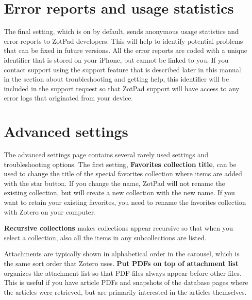 \documentclass[oneside, openany, 12pt]{tufte-book}
\newcommand{\iphone}[1]{#1}
\newcommand{\ipad}[1]{}
\newcommand{\ipadfootnote}[1]{}
\newcommand{\iphone}[1]{}
\newcommand{\ipad}[1]{#1}
\newcommand{\ipadfootnote}[1]{\footnote{#1}}
\begin{document}
\section{Error reports and usage statistics}

The final setting, which is on by default, sends anonymous usage statistics and error reports to ZotPad developers. This will help to identify potential problems that can be fixed in future versions. All the error reports are coded with a unique identifier that is stored on your \ipad{iPad}\iphone{iPhone}, but cannot be linked to you. If you contact support using the support feature that is described later in this manual in the section about troubleshooting and getting help, this identifier will be included in the support request so that ZotPad support will have access to any error logs that originated from your device.

\section{Advanced settings}

The advanced settings page contains several rarely used settings and troubleshooting options. The first setting, \textbf{Favorites collection title}, can be used to change the title of the special favorites collection where items are added with the star button. If you change the name, ZotPad will not rename the existing collection, but will create a new collection with the new name. If you want to retain your existing favorites, you need to rename the favorites collection with Zotero on your computer. 

\textbf{Recursive collections} makes collections appear recursive so that when you select a collection, also all the items in any subcollections are listed\ipadfootnote{The recursive collection preference for Zotero is described in Zotero documentation. Recursion is implemented only cached items, which means that some items in the subcollections may not be displayed before the cache has been fully updated. However, this should be rare.  \url{http://www.zotero.org/support/preferences/hidden_preferences}}. \ipad{\textbf{Unified collection navigation} removes the blue collection navigation arrows from the library and collection list and combines selecting a library or collection and opening its subcollections into a single action.}

Attachments are typically shown in alphabetical order in the carousel, which is the same sort order that Zotero uses. \textbf{Put PDFs on top of attachment list} organizes the  attachment list so that PDF files always appear before other files. This is useful if you have article PDFs and snapshots of the database pages where the articles were retrieved, but are primarily interested in the articles themselves.
\end{document}
